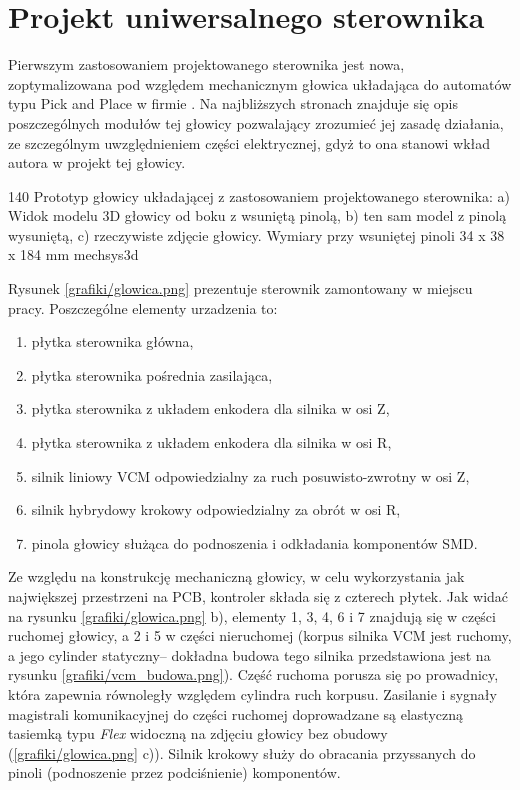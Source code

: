 \section{Projekt uniwersalnego sterownika}

Pierwszym zastosowaniem projektowanego sterownika jest nowa, zoptymalizowana pod względem mechanicznym głowica układająca do automatów typu Pick and Place w firmie \firma{}. Na najbliższych stronach znajduje się opis poszczególnych modułów tej głowicy pozwalający zrozumieć jej zasadę działania, ze szczególnym uwzględnieniem części elektrycznej, gdyż to ona stanowi wkład autora w projekt tej głowicy.

	{140}
	{Prototyp głowicy układającej z zastosowaniem projektowanego sterownika: a) Widok modelu 3D głowicy od boku z wsuniętą pinolą, b) ten sam model z pinolą wysuniętą, c) rzeczywiste zdjęcie głowicy. Wymiary przy wsuniętej pinoli 34 x 38 x 184 mm}
	{mechsys3d}

Rysunek \ref{grafiki/glowica.png} prezentuje sterownik zamontowany w miejscu pracy. Poszczególne elementy urzadzenia to:

\begin{enumerate}
	\item płytka sterownika główna,
	\item płytka sterownika pośrednia zasilająca,
	\item płytka sterownika z układem enkodera dla silnika w osi Z,
	\item płytka sterownika z układem enkodera dla silnika w osi R,
	\item silnik liniowy VCM odpowiedzialny za ruch posuwisto-zwrotny w osi Z,
	\item silnik hybrydowy krokowy odpowiedzialny za obrót w osi R,
	\item pinola głowicy służąca do podnoszenia i odkładania komponentów SMD.
\end{enumerate}

Ze względu na konstrukcję mechaniczną głowicy, w celu wykorzystania jak największej przestrzeni na PCB, kontroler składa się z czterech płytek. Jak widać na rysunku \ref{grafiki/glowica.png} b), elementy 1, 3, 4, 6 i 7 znajdują się w części ruchomej głowicy, a 2 i 5 w części nieruchomej (korpus silnika VCM jest ruchomy, a jego cylinder statyczny-- dokładna budowa tego silnika przedstawiona jest na rysunku \ref{grafiki/vcm_budowa.png}). Część ruchoma porusza się po prowadnicy, która zapewnia równoległy względem cylindra ruch korpusu. Zasilanie i sygnały magistrali komunikacyjnej do części ruchomej doprowadzane są elastyczną tasiemką typu {\it Flex} widoczną na zdjęciu głowicy bez obudowy (\ref{grafiki/glowica.png} c)). Silnik krokowy służy do obracania przyssanych do pinoli (podnoszenie przez podciśnienie) komponentów. \\

